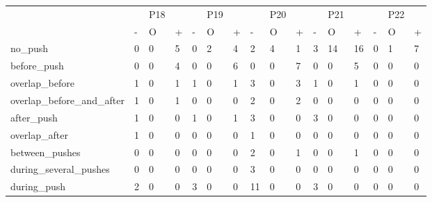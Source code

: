 \begin{table*}[h]
\begin{tabular*}{\hsize}{@{\extracolsep{\fill}}llllllllllllllll}
\end{tabular*}
  \begin{tabular*}{\hsize}{@{\extracolsep{\fill}}llllllllllllllll}
    \toprule
    & & P18 &  &  & P19 &  &  & P20 &  &  & P21 &  &  & P22\\
    \cmidrule(lr){2-4}\cmidrule(lr){5-7}\cmidrule(lr){8-10}\cmidrule(lr){11-13}\cmidrule(lr){14-16}
    & - & O & + & - & O & + & - & O & + & - & O & + & - & O & +\\
    \cmidrule(lr){2-4}\cmidrule(lr){5-7}\cmidrule(lr){8-10}\cmidrule(lr){11-13}\cmidrule(lr){14-16}
    no\_push & 0 & 0 & 5 & 0 & 2 & 4 & 2 & 4 & 1 & 3 & 14 & 16 & 0 & 1 & 7\\
    before\_push & 0 & 0 & 4 & 0 & 0 & 6 & 0 & 0 & 7 & 0 & 0 & 5 & 0 & 0 & 0\\
    overlap\_before & 1 & 0 & 1 & 1 & 0 & 1 & 3 & 0 & 3 & 1 & 0 & 1 & 0 & 0 & 0\\
    overlap\_before\_and\_after & 1 & 0 & 1 & 0 & 0 & 0 & 2 & 0 & 2 & 0 & 0 & 0 & 0 & 0 & 0\\
    after\_push & 1 & 0 & 0 & 1 & 0 & 1 & 3 & 0 & 0 & 3 & 0 & 0 & 0 & 0 & 0\\
    overlap\_after & 1 & 0 & 0 & 0 & 0 & 0 & 1 & 0 & 0 & 0 & 0 & 0 & 0 & 0 & 0\\
    between\_pushes & 0 & 0 & 0 & 0 & 0 & 0 & 2 & 0 & 1 & 0 & 0 & 1 & 0 & 0 & 0\\
    during\_several\_pushes & 0 & 0 & 0 & 0 & 0 & 0 & 3 & 0 & 0 & 0 & 0 & 0 & 0 & 0 & 0\\
    during\_push & 2 & 0 & 0 & 3 & 0 & 0 & 11 & 0 & 0 & 3 & 0 & 0 & 0 & 0 & 0\\
    \bottomrule
  \end{tabular*}
\end{table*}
